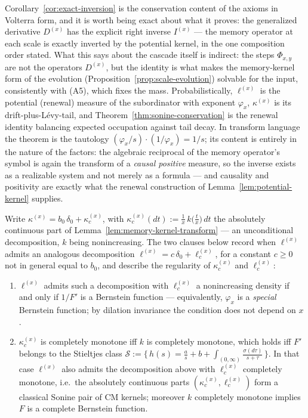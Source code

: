 Corollary~\ref{cor:exact-inversion} is the conservation content of the axioms in Volterra
form, and it is worth being exact about what it proves: the generalized derivative
$D^{(x)}$ has the explicit right inverse $I^{(x)}$ --- the memory operator at each scale is
exactly inverted by the potential kernel, in the one composition order stated. What this
says about the cascade itself is indirect: the steps $\Phi_{x,y}$ are not the operators
$D^{(x)}$, but the identity is what makes the memory-kernel form of the evolution
(Proposition~\ref{prop:scale-evolution}) solvable for the input, consistently with (A5),
which fixes the mass. Probabilistically, $\ell^{(x)}$ is the potential (renewal)
measure of the subordinator with exponent $\varphi_x$, $\kappa^{(x)}$ is its
drift-plus-Lévy-tail, and Theorem~\ref{thm:sonine-conservation} is the renewal identity
balancing expected occupation against tail decay. In transform language the theorem is the
tautology $(\varphi_x/s)\cdot(1/\varphi_x) = 1/s$; its content is entirely in the nature of
the factors: the algebraic reciprocal of the memory operator's symbol is again the
transform of a \emph{causal positive} measure, so the inverse exists as a realizable system
and not merely as a formula --- and causality and positivity are exactly what the renewal
construction of Lemma~\ref{lem:potential-kernel} supplies.

\begin{proposition}\label{prop:pair-regularity}
Write $\kappa^{(x)} = b_0\,\delta_0 + \kappa_c^{(x)}$, with
$\kappa_c^{(x)}(dt) := \tfrac1x\,k\bigl(\tfrac tx\bigr)\,dt$ the absolutely continuous part of
Lemma~\ref{lem:memory-kernel-transform} --- an unconditional decomposition, $k$ being
nonincreasing. The two clauses below record when $\ell^{(x)}$ admits an analogous
decomposition $\ell^{(x)} = c\,\delta_0 + \ell_c^{(x)}$, for a constant $c \ge 0$ not in
general equal to $b_0$, and describe the regularity of $\kappa_c^{(x)}$ and $\ell_c^{(x)}$:
\begin{enumerate}
\item $\ell^{(x)}$ admits such a decomposition with $\ell_c^{(x)}$ a nonincreasing density if
and only if $1/F'$ is a Bernstein function --- equivalently, $\varphi_x$ is a \emph{special}
Bernstein function; by dilation invariance the condition does not depend on $x$.
\item $\kappa_c^{(x)}$ is completely monotone iff $k$ is completely monotone, which holds iff
$F'$ belongs to the Stieltjes class
$\mathcal{S} := \bigl\{\,h(s) = \tfrac{a}{s} + b + \int_{(0,\infty)} \tfrac{\sigma(d\tau)}{s + \tau}\,\bigr\}$.
In that case $\ell^{(x)}$ also admits the decomposition above with $\ell_c^{(x)}$ completely
monotone, i.e.\ the absolutely continuous parts $(\kappa_c^{(x)}, \ell_c^{(x)})$ form a
classical Sonine pair of CM kernels; moreover $k$ completely monotone implies $F$ is a
complete Bernstein function.
\end{enumerate}
\end{proposition}

